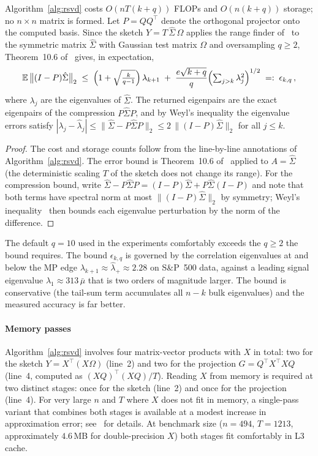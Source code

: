 \begin{proposition}\label{prop:rsvd}
Algorithm~\ref{alg:rsvd} costs $O(nT(k+q))$ FLOPs and $O(n(k+q))$ storage; no
$n \times n$ matrix is formed. Let $P = QQ^\top$ denote the orthogonal
projector onto the computed basis. Since the sketch $Y = T\,\hat\Sigma\,\Omega$
applies the range finder of~\cite{halko2011} to the symmetric matrix
$\hat\Sigma$ with Gaussian test matrix $\Omega$ and oversampling $q \geq 2$,
Theorem~10.6 of~\cite{halko2011} gives, in expectation,
\[
  \mathbb{E}\,\bigl\lVert (I - P)\hat\Sigma \bigr\rVert_2
  \;\leq\;
  \Bigl(1 + \sqrt{\tfrac{k}{q-1}}\Bigr)\,\lambda_{k+1}
  \;+\; \frac{e\sqrt{k+q}}{q}\Bigl(\textstyle\sum_{j>k}\lambda_j^2\Bigr)^{1/2}
  \;=:\; \epsilon_{k,q}\,,
\]
where $\lambda_j$ are the eigenvalues of $\hat\Sigma$. The returned eigenpairs
are the exact eigenpairs of the compression $P\hat\Sigma P$, and by Weyl's
inequality the eigenvalue errors satisfy
$|\lambda_j - \hat\lambda_j| \leq \lVert\hat\Sigma - P\hat\Sigma P\rVert_2
 \leq 2\,\lVert (I-P)\hat\Sigma \rVert_2$ for all $j \leq k$.
\end{proposition}

\begin{proof}
The cost and storage counts follow from the line-by-line annotations of
Algorithm~\ref{alg:rsvd}. The error bound is Theorem~10.6
of~\cite{halko2011} applied to $A = \hat\Sigma$ (the deterministic scaling $T$
of the sketch does not change its range). For the compression bound, write
$\hat\Sigma - P\hat\Sigma P = (I-P)\hat\Sigma + P\hat\Sigma(I-P)$ and note that
both terms have spectral norm at most $\lVert(I-P)\hat\Sigma\rVert_2$ by
symmetry; Weyl's inequality~\cite{hornjohnson2013} then bounds each eigenvalue
perturbation by the norm of the difference.
\end{proof}

The default $q = 10$ used in the experiments comfortably exceeds the $q \geq 2$
the bound requires. The bound $\epsilon_{k,q}$ is governed by the correlation
eigenvalues at and below
the MP edge $\lambda_{k+1} \approx \hat\lambda_+ \approx 2.28$ on S\&P~500 data,
against a leading signal eigenvalue $\lambda_1 \approx 313\,\bar\mu$ that is two
orders of magnitude larger. The bound is conservative (the tail-sum term
accumulates all $n - k$ bulk eigenvalues) and the measured accuracy is far better.

\paragraph{Memory passes}
Algorithm~\ref{alg:rsvd} involves four matrix-vector products with $X$ in total:
two for the sketch $Y = X^\top(X\Omega)$ (line~2) and two for the projection
$G = Q^\top X^\top XQ$ (line~4, computed as $(XQ)^\top(XQ)/T$). Reading $X$
from memory is required at two distinct stages: once for the sketch (line~2)
and once for the projection (line~4). For very large $n$ and $T$ where $X$
does not fit in memory, a single-pass variant that combines both stages is
available at a modest increase in approximation error; see~\cite{halko2011}
for details. At benchmark size ($n=494$, $T=1213$, approximately $4.6$\,MB
for double-precision $X$) both stages fit comfortably in L3 cache.

